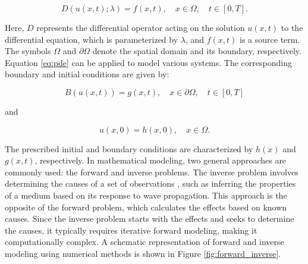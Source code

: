 \documentclass[11pt,twoside]{article}
\begin{document}
\begin{equation*}
D(u(x,t); \lambda) = f(x,t), \quad x \in \Omega, \quad t \in [0, T] .\label{eq:pde}
\end{equation*}
 
Here, $D$ represents the differential operator acting on the solution $u(x,t)$ to the differential equation, which is 
parameterized by $\lambda$, and $f(x,t)$ is a source term. The symbols $\Omega$ and $\partial\Omega$ denote the spatial 
domain and its boundary, respectively. Equation \ref{eq:pde} can be applied to model various systems. The corresponding 
boundary and initial conditions are given by:

\begin{equation*}
B (u(x, t)) = g(x, t), \quad x \in \partial \Omega, \quad t \in [0, T] 
\end{equation*}

and

\begin{equation*}
u(x, 0) = h(x, 0), \quad x \in \Omega .
\end{equation*}

The prescribed initial and boundary conditions are characterized by $h(x)$ and $g(x,t)$, respectively. In mathematical 
modeling, two general approaches are commonly used: the forward and inverse problems. The inverse problem involves 
determining the causes of a set of observations \citep{roth_neural_1994,Tarantola}, such as inferring the properties 
of a medium based on its response to wave propagation. This approach is the opposite of the forward problem, which 
calculates the effects based on known causes. Since the inverse problem starts with the effects and seeks to determine 
the causes, it typically requires iterative forward modeling, making it computationally complex. A schematic representation 
of forward and inverse modeling using numerical methods is shown in Figure \ref{fig:forward_inverse}.
\end{document}
